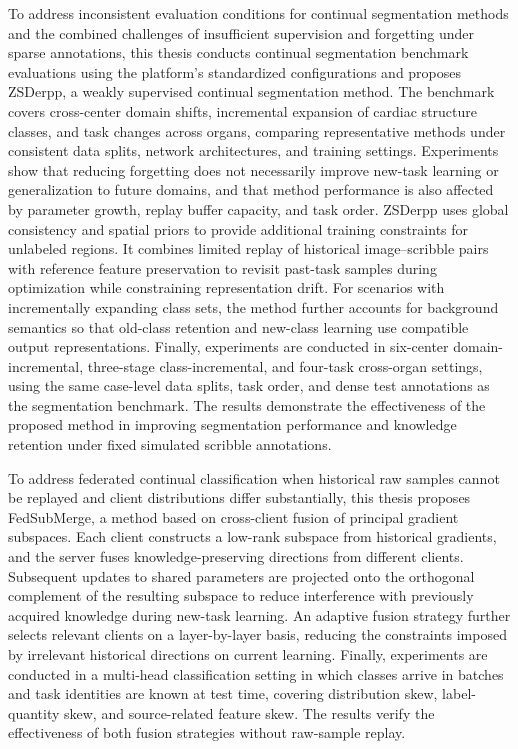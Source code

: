 To address inconsistent evaluation conditions for continual segmentation methods and the combined challenges of insufficient supervision and forgetting under sparse annotations, this thesis conducts continual segmentation benchmark evaluations using the platform’s standardized configurations and proposes ZSDerpp, a weakly supervised continual segmentation method. The benchmark covers cross-center domain shifts, incremental expansion of cardiac structure classes, and task changes across organs, comparing representative methods under consistent data splits, network architectures, and training settings. Experiments show that reducing forgetting does not necessarily improve new-task learning or generalization to future domains, and that method performance is also affected by parameter growth, replay buffer capacity, and task order. ZSDerpp uses global consistency and spatial priors to provide additional training constraints for unlabeled regions. It combines limited replay of historical image–scribble pairs with reference feature preservation to revisit past-task samples during optimization while constraining representation drift. For scenarios with incrementally expanding class sets, the method further accounts for background semantics so that old-class retention and new-class learning use compatible output representations. Finally, experiments are conducted in six-center domain-incremental, three-stage class-incremental, and four-task cross-organ settings, using the same case-level data splits, task order, and dense test annotations as the segmentation benchmark. The results demonstrate the effectiveness of the proposed method in improving segmentation performance and knowledge retention under fixed simulated scribble annotations.

To address federated continual classification when historical raw samples cannot be replayed and client distributions differ substantially, this thesis proposes FedSubMerge, a method based on cross-client fusion of principal gradient subspaces. Each client constructs a low-rank subspace from historical gradients, and the server fuses knowledge-preserving directions from different clients. Subsequent updates to shared parameters are projected onto the orthogonal complement of the resulting subspace to reduce interference with previously acquired knowledge during new-task learning. An adaptive fusion strategy further selects relevant clients on a layer-by-layer basis, reducing the constraints imposed by irrelevant historical directions on current learning. Finally, experiments are conducted in a multi-head classification setting in which classes arrive in batches and task identities are known at test time, covering distribution skew, label-quantity skew, and source-related feature skew. The results verify the effectiveness of both fusion strategies without raw-sample replay.

